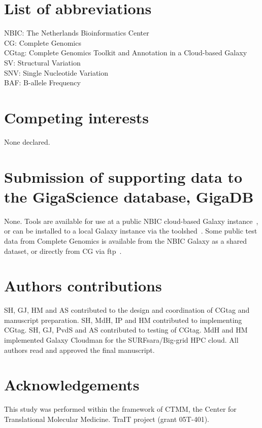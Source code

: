 \documentclass[10pt]{bmc_article}
\newenvironment{bmcformat}{\begin{raggedright}\baselineskip20pt\sloppy\setboolean{publ}{false}}{\end{raggedright}\baselineskip20pt\sloppy}
\begin{document}
\begin{bmcformat}
\section*{List of abbreviations}
NBIC: The Netherlands Bioinformatics Center \\
CG: Complete Genomics \\
CGtag: Complete Genomics Toolkit and Annotation in a Cloud-based Galaxy\\
SV: Structural Variation\\
SNV: Single Nucleotide Variation\\
BAF: B-allele Frequency

\section*{Competing interests}
None declared.


\section*{Submission of supporting data to the GigaScience database, GigaDB}
None. Tools are available for use at a public NBIC cloud-based Galaxy instance~\cite{url-nbicgalaxy}, or can be installed to a local Galaxy instance via the toolshed~\cite{url-nbictoolshed}. 
Some public test data from Complete Genomics is available from the NBIC Galaxy as a shared dataset, or directly from CG via ftp~\cite{url-cgftp}.
    
\section*{Authors contributions}
SH, GJ, HM and AS contributed to the design and coordination of CGtag and manuscript preparation. SH, MdH, IP and HM contributed to implementing CGtag.  SH, GJ, PvdS and AS contributed to testing of CGtag. MdH and HM implemented Galaxy Cloudman for the SURFsara/Big-grid HPC cloud. All authors read and approved the final manuscript. 

    

\section*{Acknowledgements}
This study was performed within the framework of CTMM, the Center for Translational Molecular Medicine. TraIT project (grant 05T-401). \\


\end{bmcformat}
\end{document}
